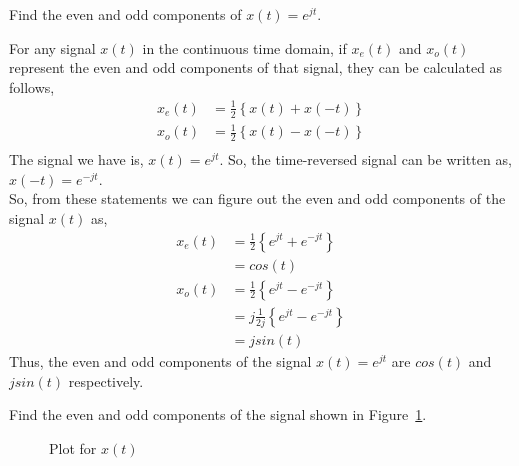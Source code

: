 \documentclass{article}[12 pt]
\begin{document}
\begin{problem}{
Find the even and odd components of $x(t)=e^{jt}$.}
\end{problem}
\begin{solution}
{
For any signal $x(t)$ in the continuous time domain, if $x_e(t)$ and $x_o(t)$ represent the even and odd components of that signal, they can be calculated as follows,
\begin{equation*}
\begin{aligned}
x_e(t)&=\frac{1}{2}\left\{x(t)+x(-t)\right\}\\
x_o(t)&=\frac{1}{2}\left\{x(t)-x(-t)\right\}\\
\end{aligned}
\end{equation*} 
The signal we have is, $x(t)=e^{jt}$. So, the time-reversed signal can be written as, $x(-t)=e^{-jt}$.\\
So, from these statements we can figure out the even and odd components of the signal $x(t)$ as,
\begin{equation*}
\begin{aligned}
x_e(t)&=\frac{1}{2}\left\{e^{jt}+e^{-jt}\right\}\\
&=cos(t)\\
x_o(t)&=\frac{1}{2}\left\{e^{jt}-e^{-jt}\right\}\\
&=j\frac{1}{2j}\left\{e^{jt}-e^{-jt}\right\}\\
&=jsin(t)
\end{aligned}
\end{equation*}
Thus, the even and odd components of the signal $x(t)=e^{jt}$ are $cos(t)$ and $jsin(t)$ respectively.
}
\end{solution}
\begin{problem}
{Find the even and odd components of the signal shown in Figure~\ref{fig:evenodd}.\begin{figure}[H]
\centering
\evenodd
\caption{Plot for $x(t)$}
\label{fig:evenodd}
\end{figure}}
\end{problem}
\newpage
\end{document}
